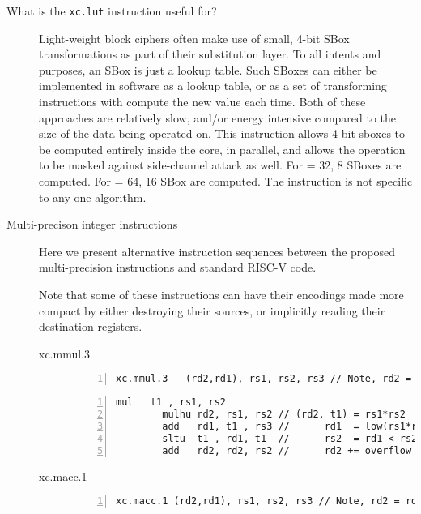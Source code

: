 \begin{description}
\item[What is the {\tt xc.lut} instruction useful for?]
Light-weight block ciphers often make use of small, 4-bit SBox
transformations as part of their substitution layer.
To all intents and purposes, an SBox is just a lookup table.
Such SBoxes can either be implemented in software as a lookup table, or
as a set of transforming instructions with compute the new value each time.
Both of these approaches are relatively slow, and/or energy intensive
compared to the size of the data being operated on.
This instruction allows 4-bit sboxes to be computed entirely
inside the core, in parallel, and allows the operation to be masked against
side-channel attack as well.
For \RVXLEN = 32, 8 SBoxes are computed.
For \RVXLEN = 64, 16 SBox are computed.
The instruction is not specific to any one algorithm.


\item[Multi-precison integer instructions]
\label{sec:design:mpn}

Here we present alternative instruction sequences between the proposed
multi-precision instructions and standard RISC-V code.

Note that some of these instructions can have their encodings
made more compact by either destroying their sources, or
implicitly reading their destination registers.

    \begin{description}

    \item[xc.mmul.3] \hfill

        \begin{lstlisting}[frame=single,title=XCRYPTOrypto,numbers=left]
        xc.mmul.3   (rd2,rd1), rs1, rs2, rs3 // Note, rd2 = rd1 | 0x1
        \end{lstlisting}

        \begin{lstlisting}[frame=single, title=RISC-V RV32IM / RV64IM,numbers=left]
        mul   t1 , rs1, rs2
        mulhu rd2, rs1, rs2 // (rd2, t1) = rs1*rs2
        add   rd1, t1 , rs3 //      rd1  = low(rs1*rs2)+rs3
        sltu  t1 , rd1, t1  //      rs2  = rd1 < rs2
        add   rd2, rd2, rs2 //      rd2 += overflow bit?
        \end{lstlisting}

    \item[xc.macc.1] \hfill

        \begin{lstlisting}[frame=single,title=XCRYPTOrypto,numbers=left]
        xc.macc.1 (rd2,rd1), rs1, rs2, rs3 // Note, rd2 = rd1 | 0x1
        \end{lstlisting}


\end{description}
\end{description}
